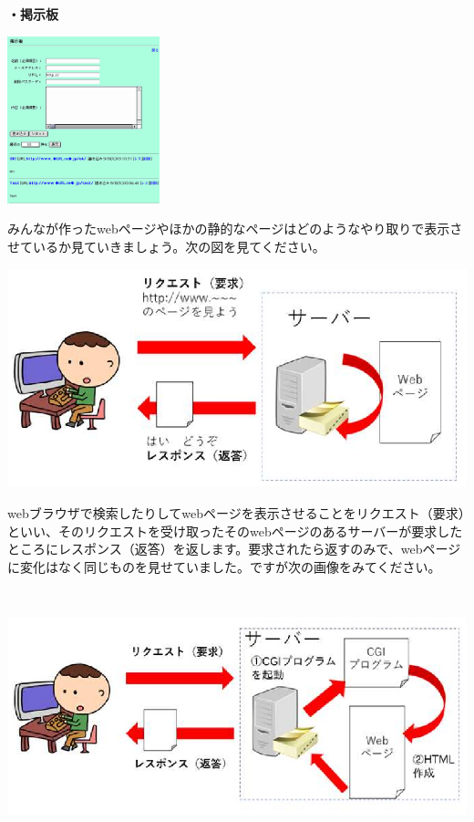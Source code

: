 \documentclass[a4paper,12pt,dvipdfmx]{jarticle}
\begin{document}
\bigskip

{\bfseries
・掲示板}



\centering
\includegraphics[width=4.431cm,height=4.845cm]{ome7-img048.png}
\flushleft





\bigskip

みんなが作ったwebページやほかの静的なページはどのようなやり取りで表示させているか見ていきましょう。次の図を見てください。



\bigskip


\centering
\includegraphics[width=13.827cm,height=6.346cm]{ome7-img049}
\flushleft

\bigskip


webブラウザで検索したりしてwebページを表示させることをリクエスト（要求）といい、そのリクエストを受け取ったそのwebページのあるサーバーが要求したところにレスポンス（返答）を返します。要求されたら返すのみで、webページに変化はなく同じものを見せていました。ですが次の画像をみてください。


\bigskip

\centering
\includegraphics[width=14.065cm,height=7.364cm]{ome7-img050}
\flushleft
\end{document}

